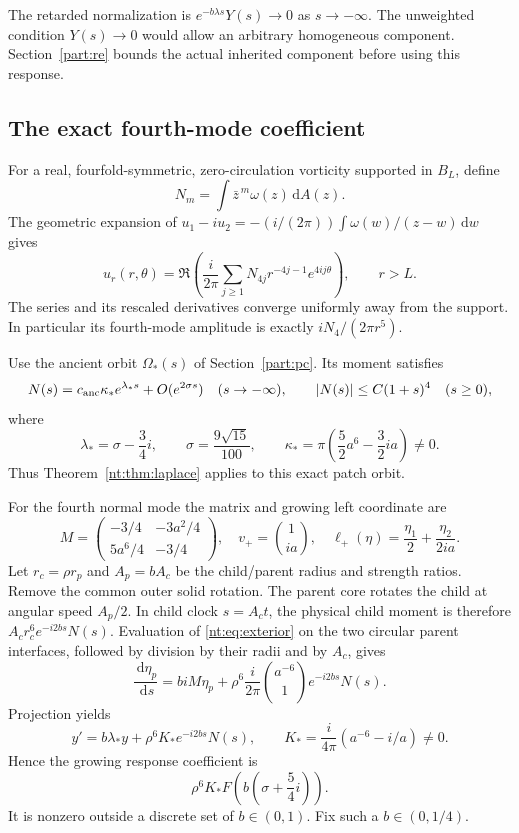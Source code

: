 \documentclass[11pt]{amsart}
\theoremstyle{remark}
\numberwithin{equation}{section}
\newcommand{\dd}{\,\mathrm d}
\begin{document}
The retarded normalization is
$e^{-b\lambda s}Y(s)\to0$ as $s\to-\infty$.
The unweighted condition $Y(s)\to0$ would allow an arbitrary
homogeneous component. Section~\ref{part:re} bounds the actual
inherited component before using this response.

\subsection{The exact fourth-mode coefficient}
For a real, fourfold-symmetric, zero-circulation vorticity
supported in $B_L$, define
\[
 N_m=\int\bar z^{\,m}\omega(z)\dd A(z).
\]
The geometric expansion of
$u_1-iu_2=-(i/(2\pi))\int\omega(w)/(z-w)\dd w$ gives
\begin{equation}\label{nt:eq:exterior}
 u_r(r,\theta)=
 \Re\left(\frac{i}{2\pi}
    \sum_{j\ge1}N_{4j}r^{-4j-1}e^{4ij\theta}\right),
 \qquad r>L.
\end{equation}
The series and its rescaled derivatives converge uniformly away
from the support. In particular its fourth-mode amplitude is
exactly $iN_4/(2\pi r^5)$.

Use the ancient orbit $\Omega_*(s)$ of Section~\ref{part:pc}.
Its moment satisfies
\[
 N(s)=c_{\rm anc}\kappa_*e^{\lambda_*s}
                     +O(e^{2\sigma s})\quad(s\to-\infty),
 \qquad |N(s)|\le C(1+s)^4\quad(s\ge0),
\]
where
\[
 \lambda_*=\sigma-\frac34i,\qquad
 \sigma=\frac{9\sqrt{15}}{100},\qquad
 \kappa_*=\pi\left(\frac52a^6-\frac32ia\right)\ne0 .
\]
Thus Theorem~\ref{nt:thm:laplace} applies to this exact patch orbit.

For the fourth normal mode the matrix and growing left coordinate are
\[
 M=\begin{pmatrix}-3/4&-3a^2/4\\5a^6/4&-3/4\end{pmatrix},
 \quad v_+=\binom1{ia},\quad
 \ell_+(\eta)=\frac{\eta_1}{2}+\frac{\eta_2}{2ia}.
\]
Let $r_c=\rho r_p$ and $A_p=bA_c$ be the child/parent radius
and strength ratios. Remove the common outer solid rotation.
The parent core rotates the child at angular speed $A_p/2$.
In child clock $s=A_ct$, the physical child moment is therefore
$A_cr_c^6e^{-i2bs}N(s)$.
Evaluation of \eqref{nt:eq:exterior} on the two circular parent
interfaces, followed by division by their radii and by $A_c$, gives
\[
 \frac{\dd\eta_p}{\dd s}
 =biM\eta_p+\rho^6\frac{i}{2\pi}
                 \binom{a^{-6}}1e^{-i2bs}N(s).
\]
Projection yields
\[
 y'=b\lambda_*y+\rho^6K_*e^{-i2bs}N(s),\qquad
 K_*=\frac{i}{4\pi}(a^{-6}-i/a)\ne0 .
\]
Hence the growing response coefficient is
\begin{equation}\label{nt:eq:transfer}
 \rho^6K_*F\left(b\left(\sigma+\frac54i\right)\right).
\end{equation}
It is nonzero outside a discrete set of $b\in(0,1)$.
Fix such a $b\in(0,1/4)$.
\end{document}

